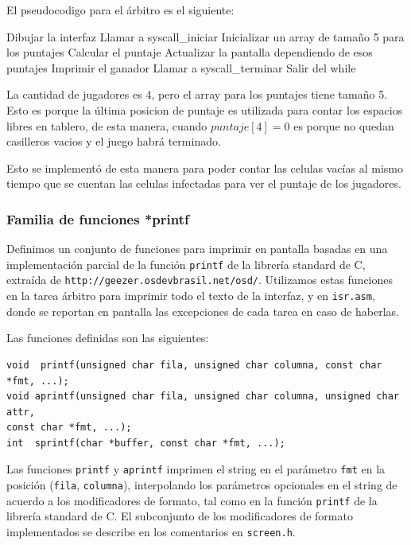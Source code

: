 \documentclass[a4paper,10pt,twoside]{article}
\newenvironment{pseudocodigo}
    {\vspace{0.5em} \begin{algorithmic}}
    {\end{algorithmic} \vspace{0.5em}}
\begin{document}
El pseudocodigo para el árbitro es el siguiente:

\begin{pseudocodigo}
  \STATE Dibujar la interfaz
  \STATE Llamar a syscall\_iniciar
  \STATE Inicializar un array de tamaño 5 para los puntajes
  \STATE
    \STATE Calcular el puntaje
    \STATE Actualizar la pantalla dependiendo de esos puntajes
    \STATE
      \STATE Imprimir el ganador
      \STATE Llamar a syscall\_terminar
      \STATE Salir del while
    \ENDIF
  \ENDWHILE
  \STATE
\end{pseudocodigo}

La cantidad de jugadores es 4, pero el array para los puntajes tiene tamaño 5. Esto es porque la última posicion de puntaje es utilizada para contar los espacios libres en tablero, de esta manera, cuando $puntaje[4]= 0$ es porque no quedan casilleros vacios y el juego habrá terminado.

Esto se implementó de esta manera para poder contar las celulas vacías al mismo tiempo que se cuentan las celulas infectadas para ver el puntaje de los jugadores.


\subsubsection{Familia de funciones *printf}

Definimos un conjunto de funciones para imprimir en pantalla basadas en una implementación parcial de la función \texttt{printf} de la librería standard de C, extraída de \texttt{http://geezer.osdevbrasil.net/osd/}. Utilizamos estas funciones en la tarea árbitro para imprimir todo el texto de la interfaz, y en \texttt{isr.asm}, donde se reportan en pantalla las excepciones de cada tarea en caso de haberlas.

Las funciones definidas son las siguientes:

\begin{verbatim}
void  printf(unsigned char fila, unsigned char columna, const char *fmt, ...);
void aprintf(unsigned char fila, unsigned char columna, unsigned char attr, 
const char *fmt, ...);
int  sprintf(char *buffer, const char *fmt, ...);
\end{verbatim}

Las funciones \texttt{printf} y \texttt{aprintf} imprimen el string en el parámetro \texttt{fmt} en la posición (\texttt{fila}, \texttt{columna}), interpolando los parámetros opcionales en el string de acuerdo a los modificadores de formato, tal como en la función \texttt{printf} de la librería standard de C. El subconjunto de los modificadores de formato implementados se describe en los comentarios en \texttt{screen.h}.
\end{document}
